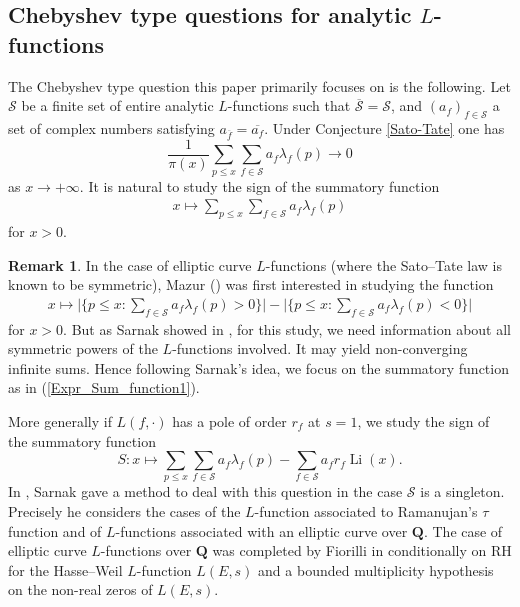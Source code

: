 \documentclass[a4paper,10pt]{amsart}
\theoremstyle{plain}
\theoremstyle{definition}
\newtheorem{Rk}{Remark}
\begin{document}
\subsection{Chebyshev type questions for analytic $L$-functions}

The Chebyshev type question this paper primarily focuses on is the following.
Let $\mathcal{S}$ be a finite set of entire analytic $L$-functions such that $\overline{\mathcal{S}}=\mathcal{S}$, 
and $(a_{f})_{f\in \mathcal{S}}$ a set of complex numbers satisfying $a_{\overline{f}}= \overline{a_{f}}$.
Under Conjecture \ref{Sato-Tate} one has 
$$\frac{1}{\pi(x)}\sum_{p\leq x}\sum_{f\in\mathcal{S}}a_{f}\lambda_{f}(p) \rightarrow 0$$ as $x\rightarrow +\infty$.
It is natural to study the sign of the summatory function
\begin{align}\label{Expr_Sum_function1}
x\mapsto \sum_{p\leq x}\sum_{f\in\mathcal{S}}a_{f}\lambda_{f}(p)
\end{align}
for $x>0$.

\begin{Rk}
In the case of elliptic curve $L$-functions (where the Sato--Tate law is known to be symmetric),
Mazur (\cite{MazurErrorTerm}) was first interested in studying the function
\begin{align*}
x \mapsto \lvert\lbrace p\leq x : \sum_{f\in\mathcal{S}}a_{f}\lambda_{f}(p) >0\rbrace\rvert - \lvert\lbrace p\leq x : \sum_{f\in\mathcal{S}}a_{f}\lambda_{f}(p) <0\rbrace\rvert
\end{align*}
for $x>0$.
But as Sarnak showed in \cite{SarnakLetter}, 
for this study, we need information about all symmetric powers of the $L$-functions involved.
It may yield non-converging infinite sums.
Hence following Sarnak's idea, we focus on the summatory function as in (\ref{Expr_Sum_function1}).
\end{Rk}

More generally if $L(f,\cdot)$ has a pole of order $r_{f}$ at $s=1$,
we study the sign of the summatory function
$$S:x\mapsto \sum_{p\leq x}\sum_{f\in\mathcal{S}}a_{f}\lambda_{f}(p)  - \sum_{f\in\mathcal{S}}a_{f}r_{f} \operatorname{Li}(x).$$
In \cite{SarnakLetter}, Sarnak gave a method to deal with this question in the case $\mathcal{S}$ is a singleton.
Precisely he considers the cases of the $L$-function associated to Ramanujan's $\tau$ function and of $L$-functions associated with an elliptic curve over $\mathbf{Q}$. 
The case of elliptic curve $L$-functions over $\mathbf{Q}$ was completed by Fiorilli in \cite{FioEC}
conditionally on RH for the Hasse--Weil $L$-function $L(E,s)$ and a bounded multiplicity hypothesis on the non-real zeros of $L(E,s)$.
\end{document}
